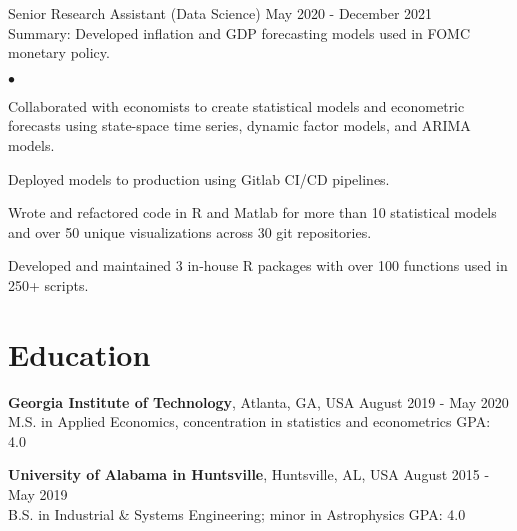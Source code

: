 \documentclass[margin, line]{res}
\newenvironment{list2}{
  \begin{list}{$\bullet$}{%
      \setlength{\itemsep}{0.04in}
      \setlength{\parsep}{0in} \setlength{\parskip}{0in}
      \setlength{\topsep}{0.05in} \setlength{\partopsep}{0in} 
      \setlength{\leftmargin}{\dimexpr 26pt-0.05in}}}
    {\end{list}}
\begin{document}
\begin{resume}
Senior Research Assistant (Data Science) \hfill May 2020 - December 2021 \\
\hspace*{3mm}
    Summary: Developed inflation and GDP forecasting models used in FOMC monetary policy.
    
    \begin{list2}
        \item Collaborated with economists to create statistical models and econometric forecasts using state-space time series, dynamic factor models, and ARIMA models.
        \item Deployed models to production using Gitlab CI/CD pipelines.
        \item Wrote and refactored code in R and Matlab for more than 10 statistical models and over 50 unique visualizations across 30 git repositories. 
        \item Developed and maintained 3 in-house R packages with over 100 functions used in 250+ scripts.
    \end{list2}


\section{\sc Education }

{\bf Georgia Institute of Technology}, Atlanta, GA, USA \hfill August 2019 - May 2020\\
M.S. in Applied Economics, concentration in statistics and econometrics \hfill GPA: 4.0


{\bf University of Alabama in Huntsville}, Huntsville, AL, USA \hfill August 2015 - May 2019 \\
B.S. in Industrial \& Systems Engineering; minor in Astrophysics \hfill GPA: 4.0

\end{resume}
\end{document}
